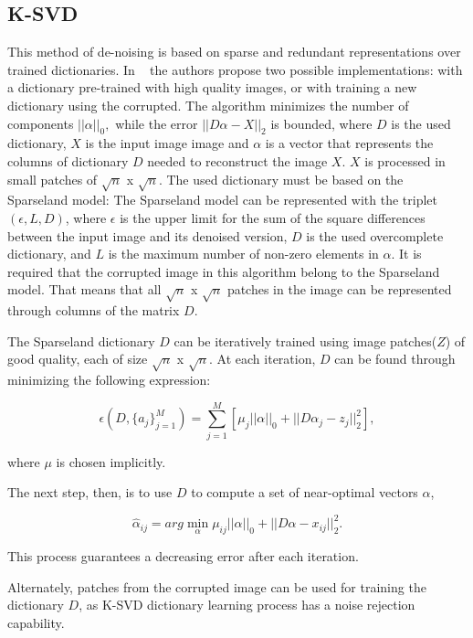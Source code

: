 \subsection{K-SVD} \label{sc:description-ksvd}
This method of de-noising is based on sparse and redundant representations over trained dictionaries. In ~\cite{ksvd} the authors propose two possible implementations: with a dictionary pre-trained with high quality images, or with training a new dictionary using the corrupted. The algorithm minimizes the number of components $||\alpha||_{0}, $ while the error $||D\alpha-X||_{2}$ is bounded, where $D$ is the used dictionary, $X$ is the input image image and $\alpha$ is a vector that represents the columns of dictionary $D$ needed to reconstruct the image $X$. $X$ is processed in small patches of $\sqrt{n}$ x $\sqrt{n}$. The used dictionary must be based on the Sparseland model: The Sparseland model can be represented with the triplet $(\epsilon,L,D)$, where $\epsilon$ is the upper limit for the sum of the square differences between the input image and its denoised version, $D$ is the used overcomplete dictionary, and $L$ is the maximum number of non-zero elements in $\alpha$. It is required that the corrupted image in this algorithm belong to the Sparseland model. That means that all $\sqrt{n}$ x $\sqrt{n}$ patches in the image can be represented through columns of the matrix $D$.

The Sparseland dictionary $D$ can be iteratively trained using image patches($Z$) of good quality, each of size $\sqrt{n}$ x $\sqrt{n}$. At each iteration, $D$ can be found through minimizing the following expression:

\begin{equation}
    \epsilon(D,\{a_{j}\}_{j=1}^{M})=\displaystyle \sum_{j=1}^{M}[\mu_{j}||\alpha||_{0}+||D\alpha_{j}-z_{j}||_{2}^{2}],
    \label{eq:ksvd_1}
\end{equation}

where $\mu$ is chosen implicitly. 

The next step, then, is to use $D$ to compute a set of near-optimal vectors $\alpha$,

\begin{equation}
    \hat{\alpha}_{ij}=arg \displaystyle\min_{\alpha} \mu_{ij}||\alpha||_{0}+||D\alpha-x_{ij}||_{2}^{2}.
    \label{eq:ksvd_2}
\end{equation}

This process guarantees a decreasing error after each iteration. 

Alternately, patches from the corrupted image can be used for training the dictionary $D$, as K-SVD dictionary learning process has a noise rejection capability.

